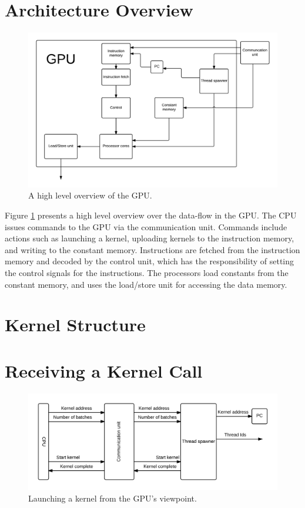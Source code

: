 \documentclass[../main/report.tex]{subfiles}
\begin{document}
\section{Architecture Overview}
\begin{figure}[H]
\centering
\includegraphics[width=\textwidth]{../gpu/diagrams/architecture_overview.png}
\caption{A high level overview of the GPU.}
\label{fig:architecture_overview}
\end{figure}
Figure \ref{fig:architecture_overview} presents a high level overview over the data-flow in the GPU.
The CPU issues commands to the GPU via the communication unit. Commands include actions such as launching a kernel, uploading kernels to the instruction memory, and writing to the constant memory.
Instructions are fetched from the instruction memory and decoded by the control unit, which has the responsibility of setting the control signals for the instructions.
The processors load constants from the constant memory, and uses the load/store unit for  accessing the data memory. 


\section{Kernel Structure}

\section{Receiving a Kernel Call}
\begin{figure}[H]
\centering
\includegraphics[width=\textwidth]{../gpu/diagrams/receiving_a_kernel_call.png}
\caption{Launching a kernel from the GPU's viewpoint.}
\label{fig:kernel_call}
\end{figure}
\end{document}
